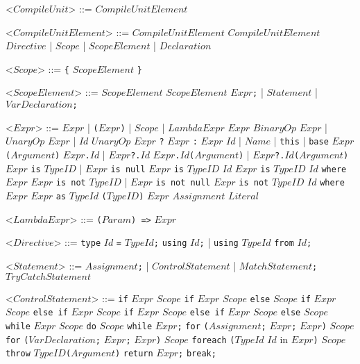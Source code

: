 \documentclass{article}
\newcommand{\gtext}[1]{<$#1$>}
\newcommand{\glit}[1]{\texttt{#1}}
\begin{document}
\begin{grammar}

	\gtext{CompileUnit} ::= $CompileUnitElement$

	\gtext{CompileUnitElement} ::= $CompileUnitElement$ $CompileUnitElement$
	\alt $Directive$ | $Scope$ | $ScopeElement$ | $Declaration$

	\gtext{Scope} ::= \glit{\{} $ScopeElement$ \glit{\}}
	
	\gtext{ScopeElement} ::= $ScopeElement$ $ScopeElement$
	\alt $Expr$\glit{;} | $Statement$	| $VarDeclaration$\glit{;}
	
	\gtext{Expr} ::= $Expr$ | \glit{(}$Expr$\glit{)} | $Scope$ | $LambdaExpr$
	\alt $Expr$ $BinaryOp$ $Expr$ | $UnaryOp$ $Expr$ | $Id$ $UnaryOp$
	\alt $Expr$ \glit{?} $Expr$ \glit{:} $Expr$
	\alt $Id$ | $Name$ | \glit{this} | \glit{base}
	\alt $Expr$\glit{(}$Argument$\glit{)}
	\alt $Expr$\glit{.}$Id$ | $Expr$\glit{?.}$Id$ 
	\alt $Expr$\glit{.}$Id$\glit{(}$Argument$\glit{)} | $Expr$\glit{?.}$Id$\glit{(}$Argument$\glit{)}
	\alt $Expr$ \glit{is} $TypeID$ | $Expr$ \glit{is null} $Expr$ \glit{is} $TypeID$ $Id$
	\alt $Expr$ \glit{is} $TypeID$ $Id$ \glit{where} $Expr$
	\alt $Expr$ \glit{is not} $TypeID$ | $Expr$ \glit{is not null}
	\alt $Expr$ \glit{is not} $TypeID$ $Id$ \glit{where} $Expr$ %
	\alt $Expr$ \glit{as} $TypeId$
	\alt \glit{(}$TypeID$\glit{)} $Expr$
	\alt $Assignment$
	\alt $Literal$
	
	\gtext{LambdaExpr} ::= \glit{(}$Param$\glit{) =>} $Expr$
	
	\gtext{Directive} ::= \glit{type} $Id$ \glit{=} $TypeId$\glit{;}
	\alt \glit{using} $Id$\glit{;} | \glit{using} $TypeId$ \glit{from} $Id$\glit{;}

	\gtext{Statement} ::= $Assignment$\glit{;} | $ControlStatement$ | $MatchStatement$\glit{;}
	\alt $TryCatchStatement$
	
	\gtext{ControlStatement} ::= \glit{if} $Expr$ $Scope$
	\alt \glit{if} $Expr$ $Scope$ \glit{else} $Scope$
	\alt \glit{if} $Expr$ $Scope$ \glit{else if} $Expr$ $Scope$
	\alt \glit{if} $Expr$ $Scope$ \glit{else if} $Expr$ $Scope$ \glit{else} $Scope$
	\alt \glit{while} $Expr$ $Scope$
	\alt \glit{do} $Scope$ \glit{while} $Expr$\glit{;}
	\alt \glit{for} \glit{(}$Assignment$\glit{;} $Expr$\glit{;} $Expr$\glit{)} $Scope$
	\alt \glit{for} \glit{(}$VarDeclaration$\glit{;} $Expr$\glit{;} $Expr$\glit{)} $Scope$
	\alt \glit{foreach} \glit{(}$TypeId$ $Id$ {in} $Expr$\glit{)} $Scope$
	\alt \glit{throw} $TypeID$\glit{(}$Argument$\glit{)}
	\alt \glit{return} $Expr$\glit{;}
	\alt \glit{break;}
	

\end{grammar}
\end{document}
